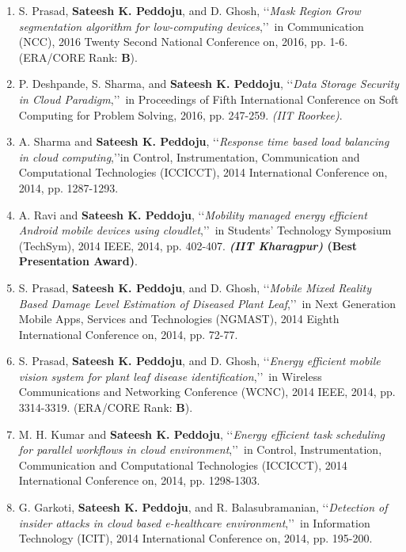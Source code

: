 \begin{enumerate}
	\item
	S. Prasad, \textbf{Sateesh K. Peddoju}, and D. Ghosh, \lq\lq \textit{Mask Region Grow segmentation algorithm for low-computing devices},\rq\rq\, in Communication (NCC), 2016 Twenty Second National Conference on, 2016, pp. 1-6. (ERA/CORE Rank: \textbf{B}).
	
	\item
	P. Deshpande, S. Sharma, and \textbf{Sateesh K. Peddoju}, \lq\lq \textit{Data Storage Security in Cloud Paradigm},\rq\rq\, in Proceedings of Fifth International Conference on Soft Computing for Problem Solving, 2016, pp. 247-259.  \textit{(IIT Roorkee)}.
	
	\item
	A. Sharma and \textbf{Sateesh K. Peddoju}, \lq\lq \textit{Response time based load balancing in cloud computing},\rq\rq in Control, Instrumentation, Communication and Computational Technologies (ICCICCT), 2014 International Conference on, 2014, pp. 1287-1293.
	
	\item
	A. Ravi and \textbf{Sateesh K. Peddoju}, \lq\lq \textit{Mobility managed energy efficient Android mobile devices using cloudlet},\rq\rq\, in Students' Technology Symposium (TechSym), 2014 IEEE, 2014, pp. 402-407.\textbf{ \textit{(IIT Kharagpur)} (Best Presentation Award)}.
	\item
	S. Prasad, \textbf{Sateesh K. Peddoju}, and D. Ghosh, \lq\lq \textit{Mobile Mixed Reality Based Damage Level Estimation of Diseased Plant Leaf},\rq\rq\, in Next Generation Mobile Apps, Services and Technologies (NGMAST), 2014 Eighth International Conference on, 2014, pp. 72-77.
	
	\item
	S. Prasad, \textbf{Sateesh K. Peddoju}, and D. Ghosh, \lq\lq \textit{Energy efficient mobile vision system for plant leaf disease identification},\rq\rq\, in Wireless Communications and Networking Conference (WCNC), 2014 IEEE, 2014, pp. 3314-3319. (ERA/CORE Rank: \textbf{B}).
	
	\item
	M. H. Kumar and \textbf{Sateesh K. Peddoju}, \lq\lq \textit{Energy efficient task scheduling for parallel workflows in cloud environment},\rq\rq\, in Control, Instrumentation, Communication and Computational Technologies (ICCICCT), 2014 International Conference on, 2014, pp. 1298-1303.
	
	\item
	G. Garkoti, \textbf{Sateesh K. Peddoju}, and R. Balasubramanian, \lq\lq \textit{Detection of insider attacks in cloud based e-healthcare environment},\rq\rq\, in Information Technology (ICIT), 2014 International Conference on, 2014, pp. 195-200.
	

\end{enumerate}

